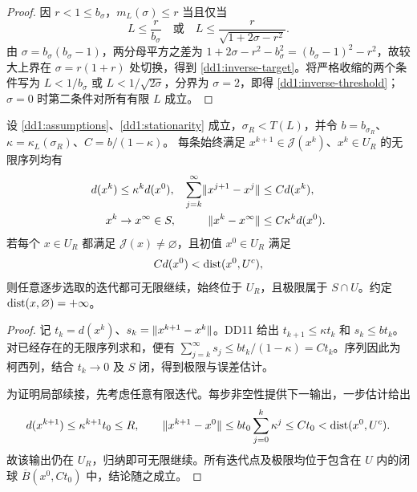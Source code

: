 \begin{proof}
因 $r<1\le b_\sigma$，$m_L(\sigma)\le r$ 当且仅当
\[
 L\le\frac r{b_\sigma}\quad\text{或}\quad
 L\le\frac r{\sqrt{1+2\sigma-r^2}}.
\]
由 $\sigma=b_\sigma(b_\sigma-1)$，两分母平方之差为
$1+2\sigma-r^2-b_\sigma^2=(b_\sigma-1)^2-r^2$，故较大上界在 $\sigma=r(1+r)$ 处切换，得到 \eqref{dd1:inverse-target}。将严格收缩的两个条件写为
$L<1/b_\sigma$ 或 $L<1/\sqrt{2\sigma}$，分界为 $\sigma=2$，即得 \eqref{dd1:inverse-threshold}；$\sigma=0$ 时第二条件对所有有限 $L$ 成立。
\end{proof}

\begin{theorem}[有限长度与局部收敛]\label{thm:dd1-trajectory}
设 \eqref{dd1:assumptions}、\eqref{dd1:stationarity} 成立，$\sigma_R<T(L)$，并令
$b=b_{\sigma_R}$、$\kappa=\kappa_L(\sigma_R)$、$C=b/(1-\kappa)$。
每条始终满足 $x^{k+1}\in\mathcal J(x^k)$、$x^k\in U_R$ 的无限序列均有
\begin{align}
 d(x^k)&\le\kappa^k d(x^0),&
 \sum_{j=k}^\infty\lVert x^{j+1}-x^j\rVert&\le C d(x^k),\label{dd1:trajectory-estimates}\\
 x^k&\to x^\infty\in S,&
 \lVert x^k-x^\infty\rVert&\le C\kappa^k d(x^0).\label{dd1:point-rate}
\end{align}
若每个 $x\in U_R$ 都满足 $\mathcal J(x)\ne\varnothing$，且初值 $x^0\in U_R$ 满足
\begin{equation}\label{dd1:localization}
 C d(x^0)<\operatorname{dist}(x^0,U^c),
\end{equation}
则任意逐步选取的迭代都可无限继续，始终位于 $U_R$，且极限属于 $S\cap U$。约定 $\operatorname{dist}(x,\varnothing)=+\infty$。
\end{theorem}

\begin{proof}
记 $t_k=d(x^k)$、$s_k=\lVert x^{k+1}-x^k\rVert$。DD11 给出 $t_{k+1}\le\kappa t_k$ 和 $s_k\le bt_k$。对已经存在的无限序列求和，便有
$\sum_{j=k}^\infty s_j\le bt_k/(1-\kappa)=Ct_k$。序列因此为柯西列，结合 $t_k\to0$ 及 $S$ 闭，得到极限与误差估计。

为证明局部续接，先考虑任意有限迭代。每步非空性提供下一输出，一步估计给出
\[
 d(x^{k+1})\le\kappa^{k+1}t_0\le R,\qquad
 \lVert x^{k+1}-x^0\rVert\le bt_0\sum_{j=0}^k\kappa^j\le Ct_0<\operatorname{dist}(x^0,U^c).
\]
故该输出仍在 $U_R$，归纳即可无限继续。所有迭代点及极限均位于包含在 $U$ 内的闭球 $\overline B(x^0,Ct_0)$ 中，结论随之成立。
\end{proof}

